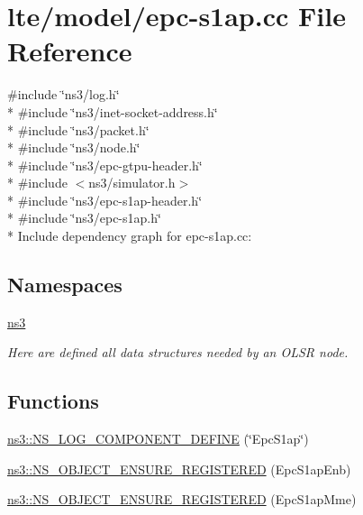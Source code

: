 \hypertarget{epc-s1ap_8cc}{}\section{lte/model/epc-\/s1ap.cc File Reference}
\label{epc-s1ap_8cc}
{\ttfamily \#include \char`\"{}ns3/log.\+h\char`\"{}}\\*
{\ttfamily \#include \char`\"{}ns3/inet-\/socket-\/address.\+h\char`\"{}}\\*
{\ttfamily \#include \char`\"{}ns3/packet.\+h\char`\"{}}\\*
{\ttfamily \#include \char`\"{}ns3/node.\+h\char`\"{}}\\*
{\ttfamily \#include \char`\"{}ns3/epc-\/gtpu-\/header.\+h\char`\"{}}\\*
{\ttfamily \#include $<$ns3/simulator.\+h$>$}\\*
{\ttfamily \#include \char`\"{}ns3/epc-\/s1ap-\/header.\+h\char`\"{}}\\*
{\ttfamily \#include \char`\"{}ns3/epc-\/s1ap.\+h\char`\"{}}\\*
Include dependency graph for epc-\/s1ap.cc\+:
\subsection*{Namespaces}
\begin{DoxyCompactItemize}
\item 
 \hyperlink{namespacens3}{ns3}
\begin{DoxyCompactList}\small\item\em Here are defined all data structures needed by an O\+L\+SR node. \end{DoxyCompactList}\end{DoxyCompactItemize}
\subsection*{Functions}
\begin{DoxyCompactItemize}
\item 
\hyperlink{namespacens3_a913e8326b018f8af4d1e31918e11f820}{ns3\+::\+N\+S\+\_\+\+L\+O\+G\+\_\+\+C\+O\+M\+P\+O\+N\+E\+N\+T\+\_\+\+D\+E\+F\+I\+NE} (\char`\"{}Epc\+S1ap\char`\"{})
\item 
\hyperlink{namespacens3_a20df44e0f2ab65578d9e4202e5daed11}{ns3\+::\+N\+S\+\_\+\+O\+B\+J\+E\+C\+T\+\_\+\+E\+N\+S\+U\+R\+E\+\_\+\+R\+E\+G\+I\+S\+T\+E\+R\+ED} (Epc\+S1ap\+Enb)
\item 
\hyperlink{namespacens3_ac1eccff4ad5cac189563d7acc843e7c4}{ns3\+::\+N\+S\+\_\+\+O\+B\+J\+E\+C\+T\+\_\+\+E\+N\+S\+U\+R\+E\+\_\+\+R\+E\+G\+I\+S\+T\+E\+R\+ED} (Epc\+S1ap\+Mme)
\end{DoxyCompactItemize}
